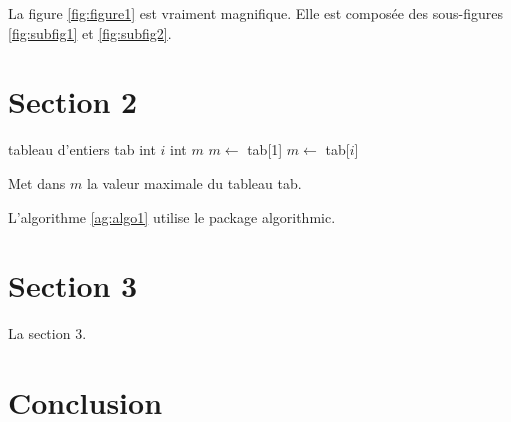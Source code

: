 La figure \ref{fig:figure1} est vraiment magnifique. Elle est composée des sous-figures \ref{fig:subfig1} et \ref{fig:subfig2}.

\section{Section 2}

\begin{algorithm}
  \begin{algorithmic}
    \STATE tableau d'entiers tab 
    \STATE int $i$ 
    \STATE int $m$ 
    \STATE
    \STATE $m \leftarrow$ tab[1]
        \STATE $m \leftarrow$ tab[$i$]
      \ENDIF
    \ENDFOR
  \end{algorithmic}
  \caption[Algorithme 1]{Met dans $m$ la valeur maximale du tableau tab.\label{ag:algo1}}
\end{algorithm}

L'algorithme \ref{ag:algo1} utilise le package algorithmic.

\section{Section 3}

La section 3.

\section{Conclusion}
